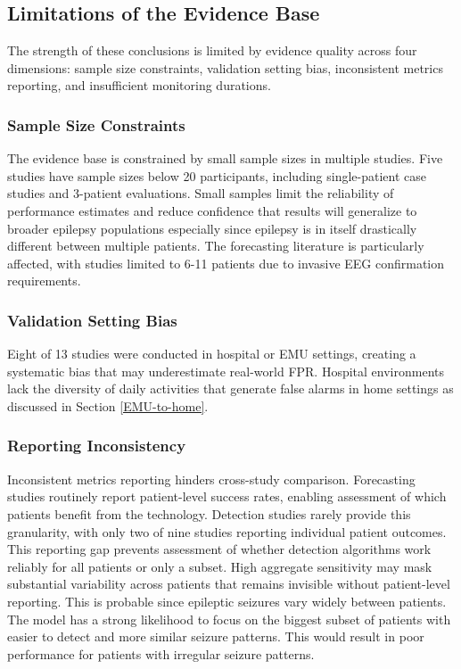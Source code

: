 \subsection{Limitations of the Evidence Base}

The strength of these conclusions is limited by evidence quality across four dimensions: sample size constraints, validation setting bias, inconsistent metrics reporting, and insufficient monitoring durations.

\subsubsection{Sample Size Constraints}

The evidence base is constrained by small sample sizes in multiple studies. Five studies have sample sizes below 20 participants, including single-patient case studies and 3-patient evaluations. Small samples limit the reliability of performance estimates and reduce confidence that results will generalize to broader epilepsy populations especially since epilepsy is in itself drastically different between multiple patients. The forecasting literature is particularly affected, with studies limited to 6-11 patients due to invasive EEG confirmation requirements.

\subsubsection{Validation Setting Bias}

Eight of 13 studies were conducted in hospital or EMU settings, creating a systematic bias that may underestimate real-world FPR. Hospital environments lack the diversity of daily activities that generate false alarms in home settings as discussed in Section \ref{EMU-to-home}.

\subsubsection{Reporting Inconsistency}

Inconsistent metrics reporting hinders cross-study comparison. Forecasting studies routinely report patient-level success rates, enabling assessment of which patients benefit from the technology. Detection studies rarely provide this granularity, with only two of nine studies reporting individual patient outcomes. This reporting gap prevents assessment of whether detection algorithms work reliably for all patients or only a subset. High aggregate sensitivity may mask substantial variability across patients that remains invisible without patient-level reporting. This is probable since epileptic seizures vary widely between patients. The model has a strong likelihood to focus on the biggest subset of patients with easier to detect and more similar seizure patterns. This would result in poor performance for patients with irregular seizure patterns.

